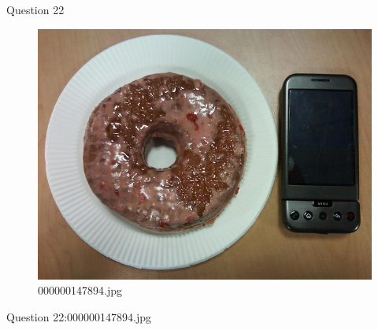 Question 22
    \begin{figure}[h]
        \centering
        \includegraphics[width=0.8\linewidth]{../image set/easy/000000147894.jpg}
        \caption{000000147894.jpg}
    \end{figure}
    Question 22:000000147894.jpg
